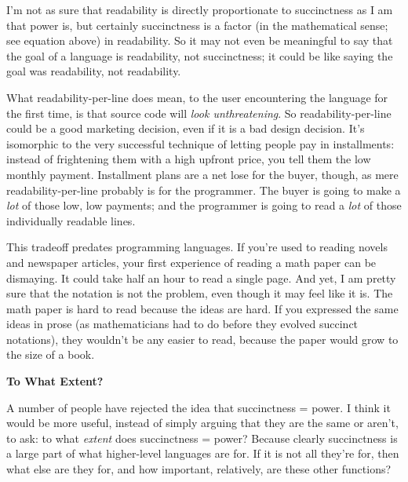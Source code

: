                   I'm not as sure that readability is directly proportionate to
                  succinctness as I am that power is, but certainly succinctness
                  is a factor (in the mathematical sense; see equation above) in
                  readability. So it may not even be meaningful to say that the
                  goal of a language is readability, not succinctness; it could
                  be like saying the goal was readability, not readability.

What
                  readability-per-line does mean, to the user encountering the
                  language for the first time, is that source code will
                  \emph{look unthreatening}. So readability-per-line could be a
                  good marketing decision, even if it is a bad design decision.
                  It's isomorphic to the very successful technique of letting
                  people pay in installments: instead of frightening them with a
                  high upfront price, you tell them the low monthly payment.
                  Installment plans are a net lose for the buyer, though, as
                  mere readability-per-line probably is for the programmer. The
                  buyer is going to make a \emph{lot} of those low, low
                  payments; and the programmer is going to read a \emph{lot} of
                  those individually readable lines.

This tradeoff
                  predates programming languages. If you're used to reading
                  novels and newspaper articles, your first experience of
                  reading a math paper can be dismaying. It could take half an
                  hour to read a single page. And yet, I am pretty sure that the
                  notation is not the problem, even though it may feel like it
                  is. The math paper is hard to read because the ideas are hard.
                  If you expressed the same ideas in prose (as mathematicians
                  had to do before they evolved succinct notations), they
                  wouldn't be any easier to read, because the paper would grow
                  to the size of a book.

\textbf{To What Extent?}

A number of people have rejected the idea that
                  succinctness = power. I think it would be more useful, instead
                  of simply arguing that they are the same or aren't, to ask: to
                  what \emph{extent} does succinctness = power? Because clearly
                  succinctness is a large part of what higher-level languages
                  are for. If it is not all they're for, then what else are they
                  for, and how important, relatively, are these other
                  functions?

